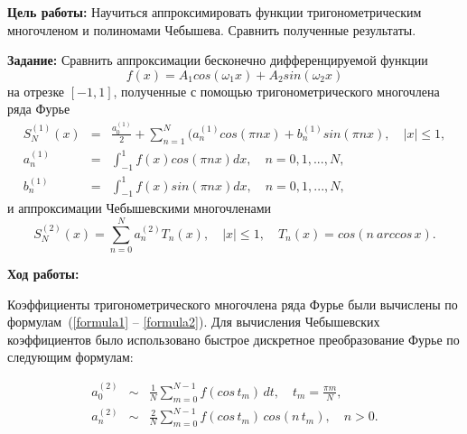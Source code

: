 \justifying
\textbf{Цель работы:}
Научиться аппроксимировать функции тригонометрическим многочленом и полиномами Чебышева. Сравнить полученные результаты.

\textbf{Задание:}
Сравнить аппроксимации бесконечно дифференцируемой функции
\begin{equation}\label{task}
    f(x) = A_1 cos(\omega_1 x) + A_2 sin(\omega_2 x) 
\end{equation}
на отрезке $[-1,1]$, полученные с помощью тригонометрического многочлена ряда Фурье
\begin{eqnarray}
    S_N^{(1)}(x) &=& \frac{a_0^{(1)}}{2} + \sum_{n=1}^{N} (a_n^{(1)} cos(\pi n x) + b_n^{(1)} sin(\pi n x), \quad |x| \leq 1, \\
    a_n^{(1)} &=& \int_{-1}^{1} f(x) cos(\pi n x) dx, \quad n = 0,1,...,N, \label{formula1}\\
    b_n^{(1)} &=& \int_{-1}^{1} f(x) sin(\pi n x) dx, \quad n = 0,1,...,N, \label{formula2}
\end{eqnarray}
и аппроксимации Чебышевскими многочленами
\begin{equation}
    S_N^{(2)}(x) = \sum_{n=0}^{N} a_n^{(2)} T_n(x), \quad |x| \leq 1, \quad T_n(x) = cos(n \: arccos \, x).
\end{equation}

\textbf{Ход работы:}

Коэффициенты тригонометрического многочлена ряда Фурье были вычислены по формулам~(\ref{formula1} -- \ref{formula2}). Для вычисления Чебышевских коэффициентов было использовано быстрое дискретное преобразование Фурье по следующим формулам:

\begin{eqnarray}
    a_0^{(2)} &\sim& \frac{1}{N} \sum_{m = 0} ^ {N - 1} f(cos \, t_m) \, dt, \quad t_m = \frac{\pi m}{N}, \\
    a_n^{(2)} &\sim& \frac{2}{N} \sum_{m = 0} ^ {N - 1} f(cos \, t_m) \, cos(n \, t_m), \quad n > 0.
\end{eqnarray}

